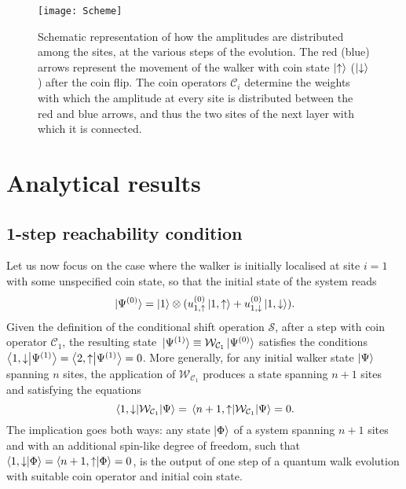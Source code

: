 \begin{figure}[tb]
\center
\texttt{[image: Scheme]}
\caption{
    Schematic representation of how the amplitudes are distributed among the sites, at the various steps of the evolution.
    The red (blue) arrows represent the movement of the walker with coin state $\ket\uparrow$ ($\ket\downarrow$) after the coin flip.
    The coin operators $\mathcal C_i$ determine the weights with which the amplitude at every site is distributed between the red and blue arrows, and thus the two sites of the next layer with which it is connected.
}
\label{fig:qw_conceptual_scheme_walker}
\end{figure}

\section{Analytical results}
\label{sec:reachability}
\subsection{1-step reachability condition}
\label{sec:1step_reachability}
Let us now focus on the case where the walker is initially localised at site $i=1$ with some unspecified coin state, so that the initial state of the system reads
\begin{equation}
    \ket*{\Psi^{(0)}} =
    \ket{1}\otimes(u^{(0)}_{1,\uparrow} \ket{1,\uparrow} +
    u^{(0)}_{1,\downarrow} \ket{1,\downarrow}).
\end{equation}
Given the definition of the conditional shift operation $\mathcal S$, after a step with coin operator $\mathcal C_1$, the resulting state ${\ket*{\Psi^{(1)}} \equiv \mathcal W_{\mathcal C_1} \ket*{\Psi^{(0)}}}$ satisfies the conditions 
${\braket{1, \downarrow}{\Psi^{(1)}} = \braket{2, \uparrow}{\Psi^{(1)}} = 0}$.
More generally, for any initial walker state $\ket{\Psi}$ spanning $n$ sites, the application of $\mathcal W_{\mathcal C_1}$ produces a state spanning $n+1$ sites and satisfying the equations
\begin{equation}
	\mel{1, \downarrow}{\mathcal W_{\mathcal C_1}}{\Psi} =
	\mel{n+1, \uparrow}{\mathcal W_{\mathcal C_1}}{\Psi} = 0.
	\label{eq:vanishing_endpoints}
\end{equation}
The implication goes both ways: any state $\ket\Phi$ of a system spanning $n+1$ sites and with an additional spin-like degree of freedom, such that
$
\braket{1, \downarrow}{\Phi} =
\braket{n+1, \uparrow}{\Phi} = 0
$,
is the output of one step of a quantum walk evolution with suitable coin operator and initial coin state.

